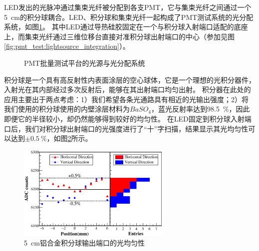 LED发出的光脉冲通过集束光纤被分配到各支PMT，它与集束光纤之间通过一个\SI{5}{\centi\meter}的积分球耦合。LED、积分球和集束光纤一起构成了PMT测试系统的光分配系统，如图\ref{fig:pmt_test:light_distribution}。
其中LED通过导热硅胶固定在一个与积分球入射端口适配的底座上，而集束光纤通过三维位移台直接对准积分球出射端口的中心（参加见图\ref{fig:pmt_test:lightsource_integration}）。
\begin{figure}[htbp]
	\centering
	\caption{PMT批量测试平台的光源与光分配系统}
	\label{fig:pmt_test:light_distribution}
\end{figure}
积分球是一个具有高反射性内表面涂层的空心球体，它是一个理想的光积分器件，入射光在其内部经过多次反射后，能够在其出射端口均匀出射。
积分器在此处的应用主要出于两点考虑：1）我们希望各条光通路具有相近的光输出强度；2）将
我们使用的积分球\cite{integrating_sphere}使用的内壁涂层材料为$BaSO_4$，蓝光反射率达到\SI{98.5}{\percent}，因此即便它的半径较小，却仍然能够得到较好的均匀性。
在LED固定到积分球入射端口后，我们对积分球出射端口的光强度进行了“十”字扫描，结果显示其光均匀性可以达到$\pm\SI{0.5}{\percent}$，如图\ref{fig:pmt_test:integrationsphere_uniformity}所示。
\begin{figure}[htbp]
	\centering
	\includegraphics[width=0.65\textwidth]{chap/pmt_test/fig/integrationsphere_uniformity.eps}
	\caption{\SI{5}{cm}铝合金积分球输出端口的光均匀性}
	\label{fig:pmt_test:integrationsphere_uniformity}
\end{figure}






